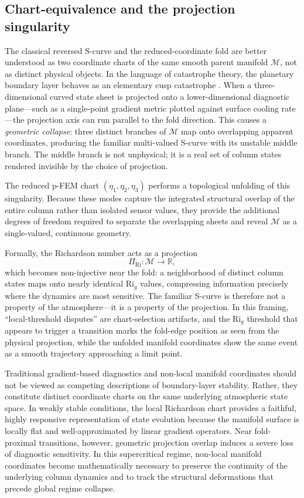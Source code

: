 \documentclass[12pt,a4paper]{article}
\newcommand{\Rig}{\mathrm{Ri}_g}
\begin{document}
\subsection{Chart-equivalence and the projection singularity}

The classical reversed S-curve and the reduced-coordinate fold are better understood as two coordinate charts of the same smooth parent manifold $\mathcal{M}$, not as distinct physical objects. In the language of catastrophe theory, the planetary boundary layer behaves as an elementary cusp catastrophe \citep{thom1975, zeeman1977, poston1978}. When a three-dimensional curved state sheet is projected onto a lower-dimensional diagnostic plane---such as a single-point gradient metric plotted against surface cooling rate---the projection axis can run parallel to the fold direction. This causes a \emph{geometric collapse}: three distinct branches of $\mathcal{M}$ map onto overlapping apparent coordinates, producing the familiar multi-valued S-curve with its unstable middle branch. The middle branch is not unphysical; it is a real set of column states rendered invisible by the choice of projection.

The reduced p-FEM chart $(\eta_1,\eta_2,\eta_3)$ performs a topological unfolding of this singularity. Because these modes capture the integrated structural overlap of the entire column rather than isolated sensor values, they provide the additional degrees of freedom required to separate the overlapping sheets and reveal $\mathcal{M}$ as a single-valued, continuous geometry.

Formally, the Richardson number acts as a projection
\begin{equation}
\Pi_{\mathrm{Ri}} : \mathcal{M} \rightarrow \mathbb{R},
\end{equation}
which becomes non-injective near the fold: a neighborhood of distinct column states maps onto nearly identical $\Rig$ values, compressing information precisely where the dynamics are most sensitive. The familiar S-curve is therefore not a property of the atmosphere---it is a property of the projection. In this framing, ``local-threshold disputes'' are chart-selection artifacts, and the $\Rig$ threshold that appears to trigger a transition marks the fold-edge position as seen from the physical projection, while the unfolded manifold coordinates show the same event as a smooth trajectory approaching a limit point.

Traditional gradient-based diagnostics and non-local manifold coordinates should not be viewed as competing descriptions of boundary-layer stability. Rather, they constitute distinct coordinate charts on the same underlying atmospheric state space. In weakly stable conditions, the local Richardson chart provides a faithful, highly responsive representation of state evolution because the manifold surface is locally flat and well-approximated by linear gradient operators. Near fold-proximal transitions, however, geometric projection overlap induces a severe loss of diagnostic sensitivity. In this supercritical regime, non-local manifold coordinates become mathematically necessary to preserve the continuity of the underlying column dynamics and to track the structural deformations that precede global regime collapse.
\end{document}
